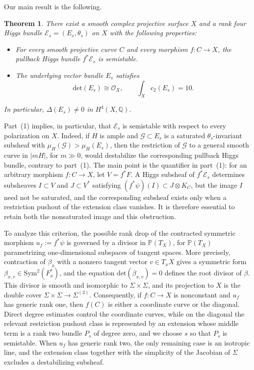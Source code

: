 \documentclass[oneside,11pt]{amsart}
\newtheorem{thm}{Theorem}[section]
\theoremstyle{definition}
\theoremstyle{remark}
\numberwithin{thm}{section}
\numberwithin{equation}{section}
\begin{document}
Our main result is the following.

\begin{thm}\label{thm:main}
There exist a smooth complex projective surface $X$ and a rank four Higgs
bundle $\mathcal{E}_s=(E_s,\theta_s)$ on $X$ with the following properties:
\begin{itemize}
\item[(1)] For every smooth projective curve $C$ and every morphism
      $f:C\to X$, the pullback Higgs bundle $f^*\mathcal{E}_s$ is semistable.
\item[(2)] The underlying vector bundle $E_s$ satisfies
      \[
       \mathrm{det}(E_s)\cong\mathcal{O}_X,
       \qquad \int_Xc_2(E_s)=10.
      \]
\end{itemize}
In particular, $\Delta(E_s)\neq0$ in $H^4(X,\mathbb{Q})$.
\end{thm}

Part~(1) implies, in particular, that $\mathcal{E}_s$ is semistable with
respect to every polarization on $X$.  Indeed, if $H$ is ample and
$\mathcal{G}\subset E_s$ is a saturated $\theta_s$-invariant subsheaf with
$\mu_H(\mathcal{G})>\mu_H(E_s)$, then the restriction of $\mathcal{G}$ to a
general smooth curve in $|mH|$, for $m\gg0$, would destabilize the
corresponding pullback Higgs bundle, contrary to part~(1).  The main point is
the quantifier in part~(1): for an arbitrary morphism $f:C\to X$, let
$V=f^*F$.  A Higgs subsheaf of $f^*\mathcal{E}_s$ determines subsheaves
$I\subset V$ and $J\subset V^*$ satisfying
$(f^*\psi)(I)\subset J\otimes K_C$, but the image $I$ need not be
saturated, and the corresponding subsheaf exists only when a restriction pushout of the extension class vanishes.  It is therefore essential to retain both the nonsaturated image and this obstruction.

To analyze this criterion, the possible rank drop of the contracted symmetric morphism $u_f:=f^*\psi$ is governed by a divisor in $\mathbb{P}(T_X)$, for $\mathbb{P}(T_X)$ parametrizing one-dimensional subspaces of tangent spaces.  More precisely, contraction of $\beta_x$ with a nonzero tangent vector $v\in T_xX$ gives a symmetric form $\beta_{x,v}\in\mathrm{Sym}^2(F_x^*)$, and the equation $\mathrm{det}(\beta_{x,v})=0$ defines the root divisor of $\beta$.  This divisor is smooth and isomorphic to
$\Sigma\times\Sigma$, and its projection to $X$ is the double cover $\Sigma\times\Sigma\to\Sigma^{(2)}$. Consequently, if $f:C\to X$ is nonconstant and $u_f$ has generic rank one, then $f(C)$ is either a coordinate curve or the diagonal.  Direct degree estimates control the coordinate curves, while on the diagonal the relevant restriction pushout class is represented by an extension whose middle term is a rank two bundle $P_s$ of degree zero, and we choose $s$ so that $P_s$ is semistable.   When $u_f$ has generic rank two, the only remaining case is an isotropic line, and the extension class together with the simplicity of the Jacobian of $\Sigma$ excludes a destabilizing subsheaf.
\end{document}
